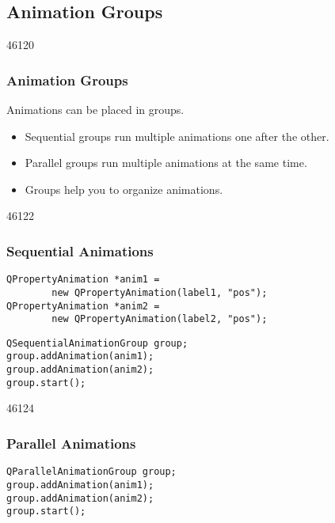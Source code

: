 \subsection{Animation Groups}
\begin{slide}{46120}\frametitle{Animation Groups}
Animations can be placed in groups.

\begin{itemize}
\item Sequential groups run multiple animations one after the other.
\end{itemize}
\smallskip
{}
\smallskip
\begin{itemize}
\item Parallel groups run multiple animations at the same time.
\end{itemize}
\smallskip
{}
\smallskip
\begin{itemize}
\item Groups help you to organize animations.
\end{itemize}
\end{slide}


\begin{slide}[fragile]{46122}\frametitle{Sequential Animations}
\label{Animation-Sequential-Animations}

\small
\begin{lstlisting}
QPropertyAnimation *anim1 =
        new QPropertyAnimation(label1, "pos");
QPropertyAnimation *anim2 =
        new QPropertyAnimation(label2, "pos");
\end{lstlisting}
\smallskip
{}
\smallskip
\begin{lstlisting}
QSequentialAnimationGroup group;
group.addAnimation(anim1);
group.addAnimation(anim2);
group.start();
\end{lstlisting}
\normalsize
\medskip
{}
\end{slide}


\begin{slide}[fragile]{46124}\frametitle{Parallel Animations}
\label{Animation-Parallel-Animations}

\vfill
\small
\begin{lstlisting}
QParallelAnimationGroup group;
group.addAnimation(anim1);
group.addAnimation(anim2);
group.start();
\end{lstlisting}
\normalsize
\vfill
{}
\end{slide}

